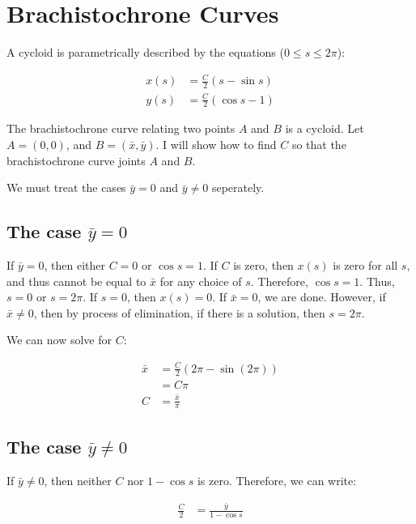 \documentclass{article}
\begin{document}
\section{Brachistochrone Curves}

A cycloid is parametrically described by the equations ($0 \leq s \leq 2 \pi$):

\begin{align}
	x(s) & = \frac C 2 \left( s - \sin s \right) \\
	y(s) & = \frac C 2 \left( \cos s - 1\right) 
\end{align}

The brachistochrone curve relating two points $A$ and $B$
	is a cycloid.
Let $A = (0,0)$, and $B = (\bar{x}, \bar{y})$.
I will show how to find $C$ so that the brachistochrone
		curve joints $A$ and $B$.

We must treat the cases $\bar{y} = 0$ and $\bar{y} \neq 0$ seperately.

\subsection{The case $\bar{y} = 0$}

If $\bar{y} = 0$, then either $C = 0$ or $\cos s = 1$.
If $C$ is zero, then $x(s)$ is zero for all $s$, and thus 
	cannot be equal to $\bar{x}$ for any choice of $s$.
Therefore, $\cos s = 1$.
Thus, $s = 0$ or $s = 2 \pi$.
If $s = 0$, then $x(s) = 0$.  
If $\bar{x} = 0$, we are done.
However, if $\bar{x} \neq 0$, then by process of elimination,
	if there is a solution, then $s = 2 \pi$.

We can now solve for $C$:

\begin{align}
\bar{x} & = \frac C 2 \left( 2 \pi - \sin ( 2 \pi) \right) \nonumber \\
	& = C \pi \nonumber \\
C & = \frac{\bar{x}}{ \pi }
\end{align}

\subsection{The case $\bar{y} \neq 0$}

If $\bar{y} \neq 0$, then neither $C$ nor $1 - \cos s$ is zero.
Therefore, we can write:

\begin{align}
\frac C 2 & = \frac {\bar{y}} {1 - \cos s}
\end{align}
\end{document}
